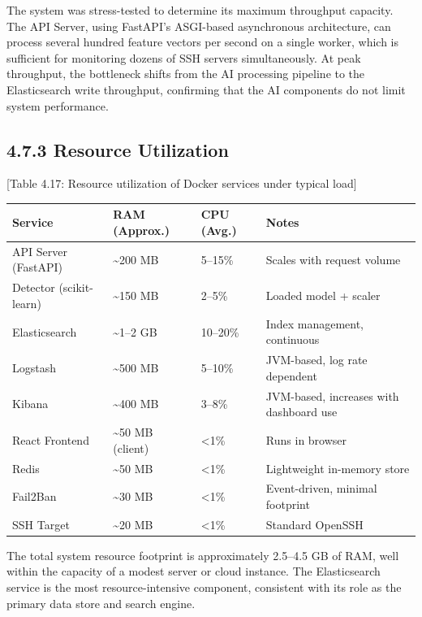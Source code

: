 \documentclass[
  a4paper]{report}
\newcounter{none} %
\begin{document}
The system was stress-tested to determine its maximum throughput
capacity. The API Server, using FastAPI's ASGI-based asynchronous
architecture, can process several hundred feature vectors per second on
a single worker, which is sufficient for monitoring dozens of SSH
servers simultaneously. At peak throughput, the bottleneck shifts from
the AI processing pipeline to the Elasticsearch write throughput,
confirming that the AI components do not limit system performance.

\subsection{4.7.3 Resource Utilization}\label{resource-utilization}

{[}Table 4.17: Resource utilization of Docker services under typical
load{]}

{\def\LTcaptype{none} %
\begin{longtable}[]{@{}llll@{}}
\toprule\noalign{}
Service & RAM (Approx.) & CPU (Avg.) & Notes \\
\midrule\noalign{}
\endhead
\bottomrule\noalign{}
\endlastfoot
API Server (FastAPI) & \textasciitilde200 MB & 5--15\% & Scales with
request volume \\
Detector (scikit-learn) & \textasciitilde150 MB & 2--5\% & Loaded model
+ scaler \\
Elasticsearch & \textasciitilde1--2 GB & 10--20\% & Index management,
continuous \\
Logstash & \textasciitilde500 MB & 5--10\% & JVM-based, log rate
dependent \\
Kibana & \textasciitilde400 MB & 3--8\% & JVM-based, increases with
dashboard use \\
React Frontend & \textasciitilde50 MB (client) & \textless1\% & Runs in
browser \\
Redis & \textasciitilde50 MB & \textless1\% & Lightweight in-memory
store \\
Fail2Ban & \textasciitilde30 MB & \textless1\% & Event-driven, minimal
footprint \\
SSH Target & \textasciitilde20 MB & \textless1\% & Standard OpenSSH \\
\end{longtable}
}

The total system resource footprint is approximately 2.5--4.5 GB of RAM,
well within the capacity of a modest server or cloud instance. The
Elasticsearch service is the most resource-intensive component,
consistent with its role as the primary data store and search engine.
\end{document}
